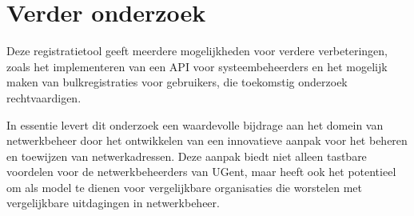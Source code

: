 \section{Verder onderzoek}
Deze registratietool geeft meerdere mogelijkheden voor verdere verbeteringen, zoals het implementeren van een API voor systeembeheerders en het mogelijk maken van bulkregistraties voor gebruikers, die toekomstig onderzoek rechtvaardigen.

In essentie levert dit onderzoek een waardevolle bijdrage aan het domein van netwerkbeheer door het ontwikkelen van een innovatieve aanpak voor het beheren en toewijzen van netwerkadressen. Deze aanpak biedt niet alleen tastbare voordelen voor de netwerkbeheerders van UGent, maar heeft ook het potentieel om als model te dienen voor vergelijkbare organisaties die worstelen met vergelijkbare uitdagingen in netwerkbeheer.




